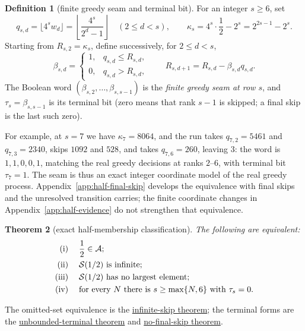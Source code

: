 \documentclass[11pt]{article}
\newcommand{\commit}{bb4e24651b37cd096d3749ef299c3317930b3a3b}
\newcommand{\repobase}{https://github.com/wcook04/plectis-lean-erdos249-257/blob/\commit}
\newcommand{\PK}{Erdos249257}
\newcommand{\lword}[4]{\href{\repobase/\PK/#1\#L#2}{#4}}
\newtheorem{theorem}{Theorem}[section]
\theoremstyle{definition}
\newtheorem{definition}[theorem]{Definition}
\theoremstyle{remark}
\begin{document}
\begin{definition}[finite greedy seam and terminal bit]\label{def:terminal-bit}
For an integer \(s\geq6\), set
\[
 q_{s,d}=\lfloor4^sw_d\rfloor
 =\left\lfloor\frac{4^s}{2^d-1}\right\rfloor
 \quad(2\leq d<s),
 \qquad
 \kappa_s=4^s\cdot\frac12-2^s=2^{2s-1}-2^s.
\]
Starting from \(R_{s,2}=\kappa_s\), define successively, for \(2\leq d<s\),
\[
 \beta_{s,d}=
 \begin{cases}
  1,&q_{s,d}\leq R_{s,d},\\
  0,&q_{s,d}>R_{s,d},
 \end{cases}
 \qquad
 R_{s,d+1}=R_{s,d}-\beta_{s,d}q_{s,d}.
\]
The Boolean word \((\beta_{s,2},\ldots,\beta_{s,s-1})\) is the
\emph{finite greedy seam at row \(s\)}, and
\(\tau_s=\beta_{s,s-1}\) is its terminal bit (zero means that rank \(s-1\)
is skipped; a final skip is the last such zero).
\end{definition}

\noindent For example, at \(s=7\) we have \(\kappa_7=8064\), and the run takes
\(q_{7,2}=5461\)
and \(q_{7,3}=2340\), skips \(1092\) and \(528\), and takes
\(q_{7,6}=260\), leaving \(3\): the word is \(1,1,0,0,1\), matching the
real greedy decisions at ranks \(2\)--\(6\), with terminal bit
\(\tau_7=1\).  The seam
is thus an exact integer coordinate model of the real greedy process.
Appendix~\ref{app:half-final-skip} develops the equivalence with
final skips and the unresolved transition carries; the finite coordinate changes in
Appendix~\ref{app:half-evidence} do not strengthen that equivalence.

\begin{theorem}[exact half-membership classification]\label{res:halfmembership}
The following are equivalent:
\[
\begin{aligned}
\textup{(i)}\;&\quad \frac12\in\mathcal A;\\
\textup{(ii)}\;&\quad \mathcal S(1/2)\ \text{is infinite};\\
\textup{(iii)}\;&\quad \mathcal S(1/2)\ \text{has no largest element};\\
\textup{(iv)}\;&\quad
  \text{for every }N\text{ there is }s\geq\max\{N,6\}
  \text{ with }\tau_s=0.
\end{aligned}
\]
\end{theorem}
\noindent The omitted-set equivalence is the
\lword{GreedyAchievementSet.lean}{2583}{half_mem_mersenneAchievementSet_iff_greedySkippedSupport_infinite}{infinite-skip theorem};
the terminal forms are the
\lword{HalfCylinderHalfMembershipClassification.lean}{126}{half_mem_mersenneAchievementSet_iff_unboundedTerminalFalse}{unbounded-terminal theorem}
and
\lword{HalfCylinderHalfMembershipClassification.lean}{235}{half_mem_mersenneAchievementSet_iff_no_lastHalfGreedySkip}{no-final-skip theorem}.
\end{document}
